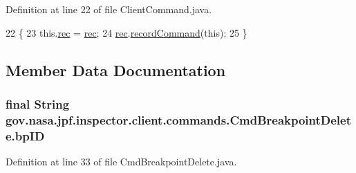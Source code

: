 Definition at line 22 of file Client\+Command.\+java.


\begin{DoxyCode}
22                                                   \{
23     this.\hyperlink{classgov_1_1nasa_1_1jpf_1_1inspector_1_1client_1_1_client_command_af4246f2427035c72a6af45a2c61361f7}{rec} = \hyperlink{classgov_1_1nasa_1_1jpf_1_1inspector_1_1client_1_1_client_command_af4246f2427035c72a6af45a2c61361f7}{rec};
24     \hyperlink{classgov_1_1nasa_1_1jpf_1_1inspector_1_1client_1_1_client_command_af4246f2427035c72a6af45a2c61361f7}{rec}.\hyperlink{classgov_1_1nasa_1_1jpf_1_1inspector_1_1client_1_1_command_recorder_af5f212124179773e46c8b45f1d01a32d}{recordCommand}(\textcolor{keyword}{this});
25   \}
\end{DoxyCode}


\subsection{Member Data Documentation}
\subsubsection[{\texorpdfstring{bp\+ID}{bpID}}]{\setlength{\rightskip}{0pt plus 5cm}final String gov.\+nasa.\+jpf.\+inspector.\+client.\+commands.\+Cmd\+Breakpoint\+Delete.\+bp\+ID\hspace{0.3cm}{\ttfamily [private]}}\hypertarget{classgov_1_1nasa_1_1jpf_1_1inspector_1_1client_1_1commands_1_1_cmd_breakpoint_delete_ae86109f41e146a0e2085efb3d03fb9f1}{}\label{classgov_1_1nasa_1_1jpf_1_1inspector_1_1client_1_1commands_1_1_cmd_breakpoint_delete_ae86109f41e146a0e2085efb3d03fb9f1}


Definition at line 33 of file Cmd\+Breakpoint\+Delete.\+java.

